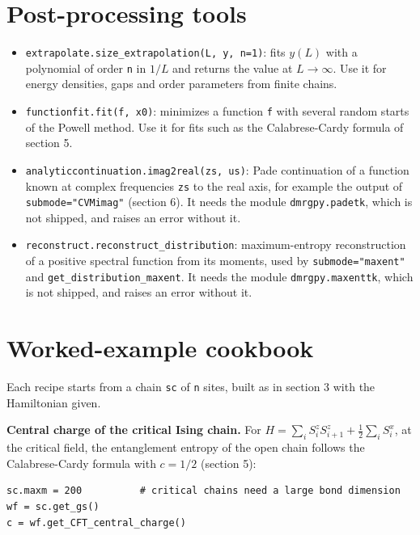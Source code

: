 \documentclass[11pt]{article}
\providecommand{\tightlist}{\setlength{\itemsep}{0pt}\setlength{\parskip}{0pt}}
\begin{document}
\section{Post-processing tools}

\begin{itemize}
\tightlist
\item
  \texttt{extrapolate.\allowbreak{}size\_\allowbreak{}extrapolation(L,\ y,\ n=1)}: fits \(y(L)\) with a
  polynomial of order \texttt{n} in \(1/L\) and returns the value at
  \(L\to\infty\). Use it for energy densities, gaps and order parameters
  from finite chains.
\item
  \texttt{functionfit.\allowbreak{}fit(f,\ x0)}: minimizes a function \texttt{f} with several random
  starts of the Powell method. Use it for fits such as the
  Calabrese-Cardy formula of section 5.
\item
  \texttt{analyticcontinuation.\allowbreak{}imag2real(zs,\ us)}: Pade continuation of a
  function known at complex frequencies \texttt{zs} to the real axis, for
  example the output of \texttt{submode="CVMimag"} (section 6). It needs the
  module \texttt{dmrgpy.\allowbreak{}padetk}, which is not shipped, and raises an error
  without it.
\item
  \texttt{reconstruct.\allowbreak{}reconstruct\_\allowbreak{}distribution}: maximum-entropy reconstruction of a positive spectral
  function from its moments, used by \texttt{submode="maxent"} and
  \texttt{get\_\allowbreak{}distribution\_\allowbreak{}maxent}. It needs the module \texttt{dmrgpy.\allowbreak{}maxenttk}, which
  is not shipped, and raises an error without it.
\end{itemize}

\section{Worked-example cookbook}

Each recipe starts from a chain \texttt{sc} of \texttt{n} sites, built as in section 3
with the Hamiltonian given.

\textbf{Central charge of the critical Ising chain.} For
\(H=\sum_iS_i^zS_{i+1}^z+\tfrac12\sum_iS_i^x\), at the critical field, the
entanglement entropy of the open chain follows the Calabrese-Cardy formula
with \(c=1/2\) (section 5):

\begin{lstlisting}
sc.maxm = 200          # critical chains need a large bond dimension
wf = sc.get_gs()
c = wf.get_CFT_central_charge()
\end{lstlisting}
\end{document}
